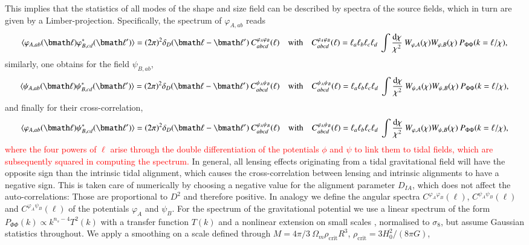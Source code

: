 \documentclass[a4paper,fleqn,usenatbib]{mnras}
\newcommand\spirou[1]{\textcolor{red}{#1}}
\newcommand{\bra}{\langle}
\newcommand{\ket}{\rangle}
\newcommand{\dd}{\mathrm{d}}
\newcommand{\dirac}{\delta_D}
\begin{document}
This implies that the statistics of all modes of the shape and size field can be described by spectra of the source fields, which in turn are given by a Limber-projection. Specifically, the spectrum of $\varphi_{A,ab}$ reads
\begin{equation}
\bra\varphi_{A,ab}(\bmath\ell)\varphi_{B,cd}^*(\bmath\ell^\prime)\ket = 
(2\pi)^2\dirac(\bmath\ell-\bmath\ell^\prime)\:C^{\varphi_A\varphi_B}_{abcd}(\ell)
\quad\mathrm{with}\quad
C^{\varphi_A\varphi_B}_{abcd}(\ell) = 
\ell_a\ell_b\ell_c\ell_d\:\int\frac{\dd\chi}{\chi^2}\:W_{\varphi,A}(\chi)W_{\varphi,B}(\chi)\:P_{\Phi\Phi}(k = \ell/\chi),
\end{equation}
similarly, one obtains for the  field $\psi_{B,ab}$,
\begin{equation}
\bra\psi_{A,ab}(\bmath\ell)\psi_{B,cd}^*(\bmath\ell^\prime)\ket = 
(2\pi)^2\dirac(\bmath\ell-\bmath\ell^\prime)\:C^{\psi_A\psi_B}_{abcd}(\ell)
\quad\mathrm{with}\quad
C^{\psi_A\psi_B}_{abcd}(\ell) = 
\ell_a\ell_b\ell_c\ell_d\:\int\frac{\dd\chi}{\chi^2}\:W_{\psi,A}(\chi)W_{\psi,B}(\chi)\:P_{\Phi\Phi}(k = \ell/\chi),
\end{equation}
and finally for their cross-correlation,
\begin{equation}
\bra\varphi_{A,ab}(\bmath\ell)\psi_{B,cd}^*(\bmath\ell^\prime)\ket =
(2\pi)^2\dirac(\bmath\ell-\bmath\ell^\prime)\:C^{\varphi_A\psi_B}_{abcd}(\ell)
\quad\mathrm{with}\quad
C^{\varphi_A\psi_B}_{abcd}(\ell) =
\ell_a\ell_b\ell_c\ell_d\:\int\frac{\dd\chi}{\chi^2}\:W_{\varphi,A}(\chi)W_{\psi,B}(\chi)\:P_{\Phi\Phi}(k = \ell/\chi),
\end{equation}
\spirou{where the four powers of $\ell$ arise through the double differentiation of the potentials $\phi$ and $\psi$ to link them to tidal fields, which are subsequently squared in computing the spectrum.} In general, all lensing effects originating from a tidal gravitational field will have the opposite sign than the intrinsic tidal alignment, which causes the cross-correlation between lensing and intrinsic alignments to have a negative sign. This is taken care of numerically by choosing a negative value for the alignment parameter $D_{IA}$, which does not affect the auto-correlations: Those are proportional to $D^2$ and therefore positive. In analogy we define the angular spectra $C^{\varphi_A\varphi_B}(\ell)$, $C^{\psi_A\psi_B}(\ell)$ and $C^{\varphi_A\psi_B}(\ell)$ of the potentials $\varphi_A$ and  $\psi_B$. For the spectrum of the gravitational potential we use a linear spectrum of the form $P_{\Phi\Phi}(k)\propto k^{n_s-4}T^2(k)$ with a transfer function $T(k)$ and a nonlinear extension on small scales \citep{cooray_power_2001, huterer_calibrating_2005}, normalised to $\sigma_8$, but assume Gaussian statistics throughout. We apply a smoothing on a scale defined through $M = 4\pi/3\:\Omega_m\rho_\mathrm{crit}R^3$, $\rho_\mathrm{crit} = 3H_0^2/(8\pi G)$, 
\end{document}
